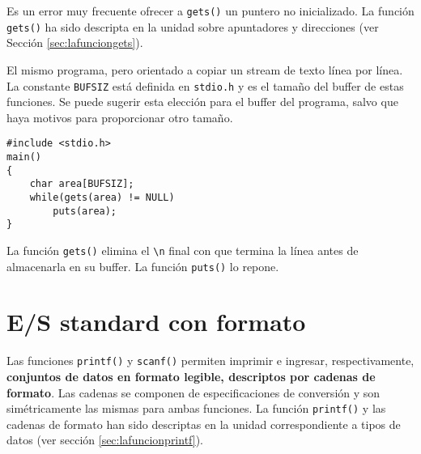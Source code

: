 Es un error muy frecuente ofrecer a \lstinline{gets()} un puntero
no inicializado. La función \lstinline{gets()} ha sido descripta en la unidad sobre
apuntadores y direcciones (ver Sección \ref{sec:lafunciongets}).


\begin{ejemplo}
El mismo programa, pero orientado a copiar un stream de texto línea por línea.
La constante \lstinline{BUFSIZ} está definida en \lstinline{stdio.h} y es el tamaño del buffer de estas
funciones. Se puede sugerir esta elección para el buffer del programa, salvo
que haya motivos para proporcionar otro tamaño.

\begin{lstlisting}
#include <stdio.h>
main()
{
    char area[BUFSIZ];
    while(gets(area) != NULL)
        puts(area);
}
\end{lstlisting}
\end{ejemplo}

La función \lstinline{gets()} elimina el \lstinline{\n} final con que termina la línea antes de
almacenarla en su buffer. La función \lstinline{puts()} lo repone.


\section{E/S standard con formato}
\label{subsec:esstandardformato}
Las funciones \lstinline{printf()} y \lstinline{scanf()} permiten imprimir e ingresar, respectivamente,
\textbf{conjuntos de datos en formato legible, descriptos por cadenas de formato}. Las
cadenas se componen de especificaciones de conversión y son simétricamente las
mismas para ambas funciones. La función \lstinline{printf()} y las cadenas de formato han
sido descriptas en la unidad correspondiente a tipos de datos (ver sección \ref{sec:lafuncionprintf}).

